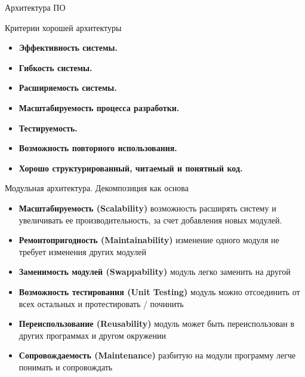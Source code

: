 \documentclass[10pt,pdf,hyperref={unicode}]{beamer}%
\begin{document}
\begin{frame}{Архитектура ПО}
  \begin{figure}[h]
  \end{figure}
\end{frame}

\begin{frame}{Критерии хорошей архитектуры}
  \begin{itemize}
    \item \textbf{Эффективность системы.}
    \item \textbf{Гибкость системы.}
    \item \textbf{Расширяемость системы.}
    \item \textbf{Масштабируемость процесса разработки.}
    \item \textbf{Тестируемость.}
    \item \textbf{Возможность повторного использования.}
    \item \textbf{Хорошо структурированный, читаемый и понятный код.}
  \end{itemize}
\end{frame}

\begin{frame}{Модульная архитектура. Декомпозиция как основа}
\begin{itemize}
    \item \textbf{Масштабируемость (Scalability)}
    возможность расширять систему и увеличивать ее производительность, за счет добавления новых модулей.
    \item \textbf{Ремонтопригодность (Maintainability)}
    изменение одного модуля не требует изменения других модулей
    \item \textbf{Заменимость модулей (Swappability)}
    модуль легко заменить на другой
    \item \textbf{Возможность тестирования (Unit Testing)}
    модуль можно отсоединить от всех остальных и протестировать / починить
    \item \textbf{Переиспользование (Reusability)}
    модуль может быть переиспользован в других программах и другом окружении
    \item \textbf{Сопровождаемость (Maintenance)}
    разбитую на модули программу легче понимать и сопровождать
\end{itemize}

\end{frame}
\end{document}
